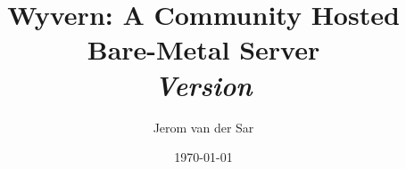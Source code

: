 \documentclass[a4paper]{article}
\title{
    Wyvern: A Community Hosted\\
    Bare-Metal Server\\
    \vspace{10px}
    \large \textit{Version \versionnumber}
}
\author{Jerom van der Sar}
\date{\today}
\begin{document}
\begin{titlepage}
    \maketitle
\end{titlepage}


\newpage

\tableofcontents
\newpage
{}






\newpage
\appendix
\appendixpage



\end{document}
